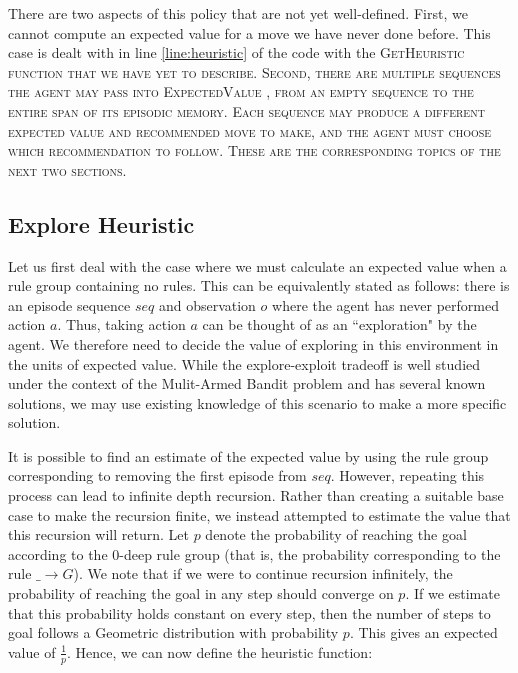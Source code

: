 \documentclass[letterpaper]{article} %
\begin{document}
There are two aspects of this policy that are not yet well-defined. First, we cannot compute an expected value for a move we have never done before. This case is dealt with in line \ref{line:heuristic} of the code with the \scshape GetHeuristic \normalfont function that we have yet to describe. Second, there are multiple sequences the agent may pass into \scshape ExpectedValue \normalfont, from an empty sequence to the entire span of its episodic memory. Each sequence may produce a different expected value and recommended move to make, and the agent must choose which recommendation to follow. These are the corresponding topics of the next two sections.

\subsection{Explore Heuristic}
Let us first deal with the case where we must calculate an expected value when a rule group containing no rules. This can be equivalently stated as follows: there is an episode sequence $seq$ and observation $o$ where the agent has never performed action $a$. Thus, taking action $a$ can be thought of as an ``exploration" by the agent. We therefore need to decide the value of exploring in this environment in the units of expected value. While the explore-exploit tradeoff is well studied under the context of the Mulit-Armed Bandit problem and has several known solutions, we may use existing knowledge of this scenario to make a more specific solution.

It is possible to find an estimate of the expected value by using the rule group corresponding to removing the first episode from $seq$. However, repeating this process can lead to infinite depth recursion. Rather than creating a suitable base case to make the recursion finite, we instead attempted to estimate the value that this recursion will return. Let $p$ denote the probability of reaching the goal according to the $0$-deep rule group (that is, the probability corresponding to the rule $\_ \rightarrow G$). We note that if we were to continue recursion infinitely, the probability of reaching the goal in any step should converge on $p$. If we estimate that this probability holds constant on every step, then the number of steps to goal follows a Geometric distribution with probability $p$. This gives an expected value of $\frac{1}{p}$. Hence, we can now define the heuristic function:
\end{document}
